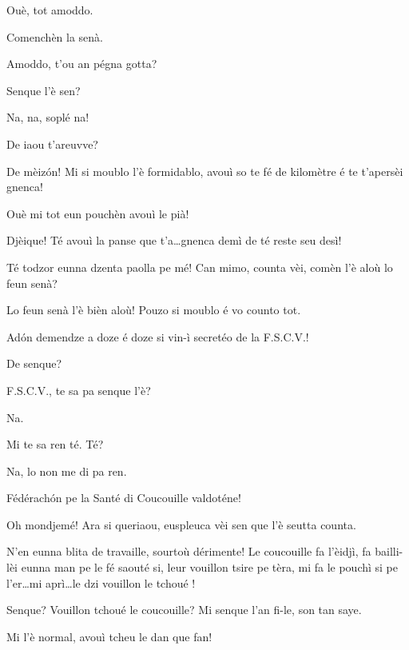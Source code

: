 \begin{drama}
\Tuenospeaks Ouè, tot amoddo.

\Richardspeaks Comenchèn la senà.

\Gerominespeaks Amoddo,  t'ou an pégna got\-ta?

\Richardspeaks Senque l'è sen?


\Richardspeaks Na, na, soplé na!

\Tuenospeaks{} De iaou t'areuvve? 

\Richardspeaks De mèiz\'on! Mi si moublo l'è formidablo, avouì so te fé de kilomètre é te t'apersèi gnenca! 

\Tuenospeaks Ouè mi tot eun pouchèn avouì le pià!

\Richardspeaks Djèique! Té avouì la panse que t'a\ldots  gnenca demì de té reste seu desì!

\Tuenospeaks{} Té todzor eunna dzenta paolla pe mé! Can mimo, counta vèi, comèn l'è aloù lo feun senà?

\Richardspeaks Lo feun senà l'è bièn aloù! Pouzo si moublo é vo counto tot.


\Richardspeaks Ad\'on demendze a doze é doze si vin-ì secretéo de la F.S.C.V.!

\Tcheuttespeaks De senque?

\Richardspeaks{} F.S.C.V., te sa pa senque l'è?

\Tuenospeaks Na.

\Richardspeaks Mi te sa ren té.  Té?

\Gerominespeaks Na, lo non me di pa ren.

\Richardspeaks Fédérach\'on pe la Santé di Coucouille valdoténe!

\Tuenospeaks Oh mondjemé! Ara si queriaou, euspleuca vèi sen que l'è seutta counta.

\Richardspeaks N'en eunna blita de travaille, sourtoù dérimente! Le coucouille fa l'èidjì, fa bailli-lèi eunna man pe le fé saouté si, leur  vouillon tsire pe tèra, mi fa le pouchì si pe l'er\ldots mi aprì\ldots le dzi vouillon le tchoué \panico !

\Gerominespeaks Senque? Vouillon tchoué le coucouille? Mi senque l'an fi-le, son tan saye.

\Tuenospeaks Mi l'è normal, avouì tcheu le dan que fan!


\end{drama}
